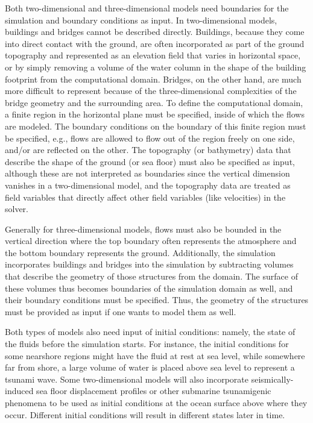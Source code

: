 Both two-dimensional and three-dimensional models need boundaries for the simulation and boundary conditions as input. In two-dimensional models, buildings and bridges cannot be described directly.  Buildings, because they come into direct contact with the ground, are often incorporated as part of the ground topography and represented as an elevation field that varies in horizontal space, or by simply removing a volume of the water column in the shape of the building footprint from the computational domain. Bridges, on the other hand, are much more difficult to represent because of the three-dimensional complexities of the bridge geometry and the surrounding area.  To define the computational domain, a finite region in the horizontal plane must be specified, inside of which the flows are modeled. The boundary conditions on the boundary of this finite region must be specified, e.g., flows are allowed to flow out of the region freely on one side, and/or are reflected on the other. The topography (or bathymetry) data that describe the shape of the ground (or sea floor) must also be specified as input, although these are not interpreted as boundaries since the vertical dimension vanishes in a two-dimensional model, and the topography data are treated as field variables that directly affect other field variables (like velocities) in the solver.

Generally for three-dimensional models, flows must also be bounded in the vertical direction where the top boundary often represents the atmosphere and the bottom boundary represents the ground. Additionally, the simulation incorporates buildings and bridges into the simulation by subtracting volumes that describe the geometry of those structures from the domain. The surface of these volumes thus becomes boundaries of the simulation domain as well, and their boundary conditions must be specified. Thus, the geometry of the structures must be provided as input if one wants to model them as well.

Both types of models also need input of initial conditions: namely, the state of the fluids before the simulation starts. For instance, the initial conditions for some nearshore regions might have the fluid at rest at sea level, while somewhere far from shore, a large volume of water is placed above sea level to represent a tsunami wave. Some two-dimensional models will also incorporate seismically-induced sea floor displacement profiles or other submarine tsunamigenic phenomena to be used as initial conditions at the ocean surface above where they occur. Different initial conditions will result in different states later in time.

